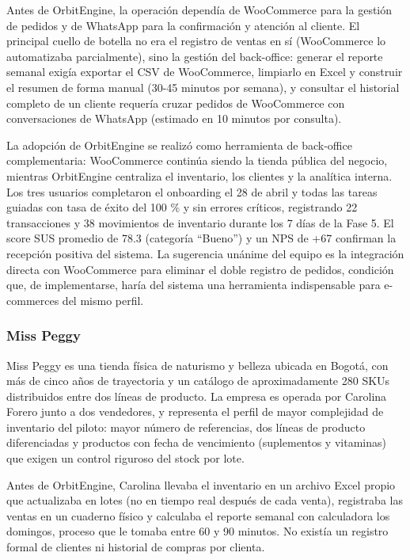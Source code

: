 Antes de OrbitEngine, la operación dependía de WooCommerce para la gestión de pedidos y de WhatsApp para la confirmación y atención al cliente. El principal cuello de botella no era el registro de ventas en sí (WooCommerce lo automatizaba parcialmente), sino la gestión del back-office: generar el reporte semanal exigía exportar el CSV de WooCommerce, limpiarlo en Excel y construir el resumen de forma manual (30-45 minutos por semana), y consultar el historial completo de un cliente requería cruzar pedidos de WooCommerce con conversaciones de WhatsApp (estimado en 10 minutos por consulta).

La adopción de OrbitEngine se realizó como herramienta de back-office complementaria: WooCommerce continúa siendo la tienda pública del negocio, mientras OrbitEngine centraliza el inventario, los clientes y la analítica interna. Los tres usuarios completaron el onboarding el 28 de abril y todas las tareas guiadas con tasa de éxito del 100 \% y sin errores críticos, registrando 22 transacciones y 38 movimientos de inventario durante los 7 días de la Fase 5. El score SUS promedio de 78.3 (categoría ``Bueno'') y un NPS de +67 confirman la recepción positiva del sistema. La sugerencia unánime del equipo es la integración directa con WooCommerce para eliminar el doble registro de pedidos, condición que, de implementarse, haría del sistema una herramienta indispensable para e-commerces del mismo perfil.

\subsubsection{Miss Peggy}\label{miss-peggy}

Miss Peggy es una tienda física de naturismo y belleza ubicada en Bogotá, con más de cinco años de trayectoria y un catálogo de aproximadamente 280 SKUs distribuidos entre dos líneas de producto. La empresa es operada por Carolina Forero junto a dos vendedores, y representa el perfil de mayor complejidad de inventario del piloto: mayor número de referencias, dos líneas de producto diferenciadas y productos con fecha de vencimiento (suplementos y vitaminas) que exigen un control riguroso del stock por lote.

Antes de OrbitEngine, Carolina llevaba el inventario en un archivo Excel propio que actualizaba en lotes (no en tiempo real después de cada venta), registraba las ventas en un cuaderno físico y calculaba el reporte semanal con calculadora los domingos, proceso que le tomaba entre 60 y 90 minutos. No existía un registro formal de clientes ni historial de compras por clienta.

